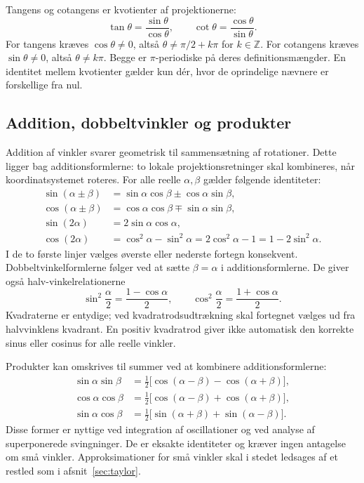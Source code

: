 Tangens og cotangens er kvotienter af projektionerne:
\[
 \tan\theta=\frac{\sin\theta}{\cos\theta},\qquad
 \cot\theta=\frac{\cos\theta}{\sin\theta}.
\]
For tangens kræves $\cos\theta\ne0$, altså
$\theta\ne\pi/2+k\pi$ for $k\in\mathbb{Z}$. For cotangens kræves
$\sin\theta\ne0$, altså $\theta\ne k\pi$. Begge er $\pi$-periodiske på
deres definitionsmængder. En identitet mellem kvotienter gælder kun dér,
hvor de oprindelige nævnere er forskellige fra nul.

\subsection{Addition, dobbeltvinkler og produkter}
Addition af vinkler svarer geometrisk til sammensætning af rotationer.
Dette ligger bag additionsformlerne: to lokale projektionsretninger skal
kombineres, når koordinatsystemet roteres. For alle reelle $\alpha,\beta$
gælder følgende identiteter:
\begin{align*}
 \sin(\alpha\pm\beta)&=\sin\alpha\cos\beta\pm\cos\alpha\sin\beta,\\
 \cos(\alpha\pm\beta)&=\cos\alpha\cos\beta\mp\sin\alpha\sin\beta,\\
 \sin(2\alpha)&=2\sin\alpha\cos\alpha,\\
 \cos(2\alpha)&=\cos^2\alpha-\sin^2\alpha
               =2\cos^2\alpha-1=1-2\sin^2\alpha.
\end{align*}
I de to første linjer vælges øverste eller nederste fortegn konsekvent.
Dobbeltvinkelformlerne følger ved at sætte $\beta=\alpha$ i
additionsformlerne. De giver også halv-vinkelrelationerne
\[
 \sin^2\frac{\alpha}{2}=\frac{1-\cos\alpha}{2},\qquad
 \cos^2\frac{\alpha}{2}=\frac{1+\cos\alpha}{2}.
\]
Kvadraterne er entydige; ved kvadratrodsudtrækning skal fortegnet vælges
ud fra halvvinklens kvadrant. En positiv kvadratrod giver ikke automatisk
den korrekte sinus eller cosinus for alle reelle vinkler.

Produkter kan omskrives til summer ved at kombinere additionsformlerne:
\begin{align*}
 \sin\alpha\sin\beta
   &=\tfrac12\bigl[\cos(\alpha-\beta)-\cos(\alpha+\beta)\bigr],\\
 \cos\alpha\cos\beta
   &=\tfrac12\bigl[\cos(\alpha-\beta)+\cos(\alpha+\beta)\bigr],\\
 \sin\alpha\cos\beta
   &=\tfrac12\bigl[\sin(\alpha+\beta)+\sin(\alpha-\beta)\bigr].
\end{align*}
Disse former er nyttige ved integration af oscillationer og ved analyse af
superponerede svingninger. De er eksakte identiteter og kræver ingen
antagelse om små vinkler. Approksimationer for små vinkler skal i stedet
ledsages af et restled som i afsnit~\ref{sec:taylor}.

